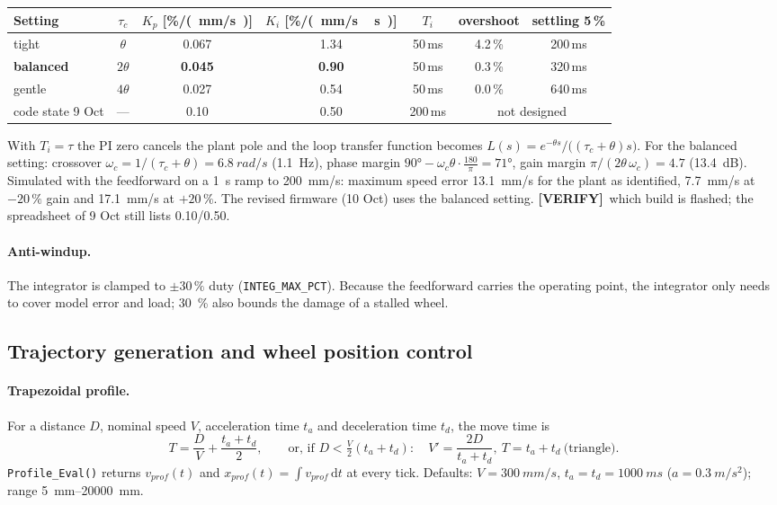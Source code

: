 \documentclass[11pt,a4paper]{article}
\newcommand{\mk}[2]{\textsf{\scriptsize\bfseries\colorbox{#1bg}{\color{#1}[#2]}}}
\newcommand{\VERIFY}{\mk{cold}{VERIFY}}
\newcommand{\code}[1]{\texttt{\small #1}}
\newcommand{\dd}{\,\mathrm{d}}
\begin{document}
\begin{center}
\small
\begin{tabular}{@{}lcccccc@{}}
\toprule
\textbf{Setting} & $\tau_c$ & $K_p$ [\si{\percent/(mm/s)}] & $K_i$ [\si{\percent/(mm/s\,s)}] & $T_i$ & overshoot & settling 5\,\%\\
\midrule
tight    & $\theta$  & 0.067 & 1.34 & 50\,ms & 4.2\,\% & 200\,ms\\
\textbf{balanced} & $2\theta$ & \textbf{0.045} & \textbf{0.90} & 50\,ms & 0.3\,\% & 320\,ms\\
gentle   & $4\theta$ & 0.027 & 0.54 & 50\,ms & 0.0\,\% & 640\,ms\\
\midrule
code state 9 Oct & --- & 0.10 & 0.50 & 200\,ms & \multicolumn{2}{c}{not designed}\\
\bottomrule
\end{tabular}
\end{center}

With $T_i=\tau$ the PI zero cancels the plant pole and the loop transfer
function becomes $L(s)=e^{-\theta s}/\bigl((\tau_c+\theta)s\bigr)$. For the balanced
setting: crossover $\omega_c=1/(\tau_c+\theta)=\qty{6.8}{rad/s}$ (\qty{1.1}{Hz}),
phase margin $\ang{90}-\omega_c\theta\cdot\tfrac{180}{\pi}=\ang{71}$, gain margin
$\pi/(2\theta\,\omega_c)=4.7$ (\qty{13.4}{dB}). Simulated with the feedforward on a
\qty{1}{s} ramp to \qty{200}{mm/s}: maximum speed error \qty{13.1}{mm/s} for the
plant as identified, \qty{7.7}{mm/s} at $-20\,\%$ gain and \qty{17.1}{mm/s} at
$+20\,\%$. The revised firmware (10 Oct) uses the balanced setting.
\VERIFY\ which build is flashed; the spreadsheet of 9 Oct still lists 0.10/0.50.

\paragraph{Anti-windup.} The integrator is clamped to $\pm30\,\%$ duty
(\code{INTEG\_MAX\_PCT}). Because the feedforward carries the operating point, the
integrator only needs to cover model error and load; \qty{30}{\percent} also bounds
the damage of a stalled wheel.

\subsection{Trajectory generation and wheel position control}\label{sec:profile}

\paragraph{Trapezoidal profile.} For a distance $D$, nominal speed $V$,
acceleration time $t_a$ and deceleration time $t_d$, the move time is
\begin{equation}
T=\frac{D}{V}+\frac{t_a+t_d}{2},\qquad\text{or, if } D<\tfrac V2(t_a+t_d):\quad
V'=\frac{2D}{t_a+t_d},\ T=t_a+t_d\ \text{(triangle)}.
\end{equation}
\code{Profile\_Eval()} returns $v_{prof}(t)$ and $x_{prof}(t)=\int v_{prof}\dd t$ at
every tick. Defaults: $V=\qty{300}{mm/s}$, $t_a=t_d=\qty{1000}{ms}$
($a=\qty{0.3}{m/s^2}$); range \qtyrange{5}{20000}{mm}.
\end{document}
